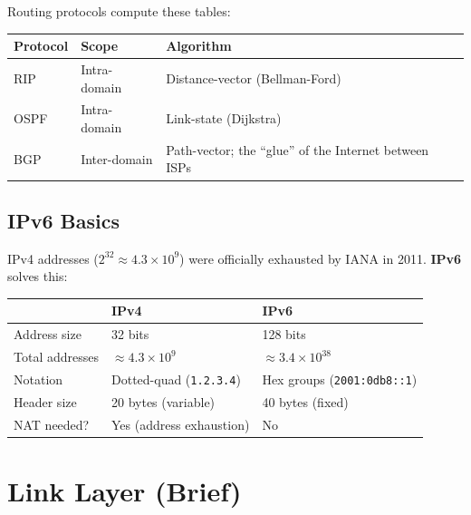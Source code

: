 \documentclass[oneside]{book}
\begin{document}
Routing protocols compute these tables:

\begin{center}
\begin{tabularx}{\linewidth}{llX}
\toprule
\textbf{Protocol} & \textbf{Scope} & \textbf{Algorithm} \\
\midrule
RIP  & Intra-domain & Distance-vector (Bellman-Ford) \\
OSPF & Intra-domain & Link-state (Dijkstra) \\
BGP  & Inter-domain  & Path-vector; the ``glue'' of the Internet between ISPs \\
\bottomrule
\end{tabularx}
\end{center}


\section{IPv6 Basics}

IPv4 addresses ($2^{32} \approx 4.3 \times 10^9$) were officially exhausted by
IANA in 2011.  \textbf{IPv6} solves this:

\begin{center}
\begin{tabularx}{\linewidth}{lll}
\toprule
 & \textbf{IPv4} & \textbf{IPv6} \\
\midrule
Address size & 32 bits & 128 bits \\
Total addresses & $\approx 4.3 \times 10^9$ & $\approx 3.4 \times 10^{38}$ \\
Notation & Dotted-quad (\texttt{1.2.3.4}) & Hex groups (\texttt{2001:0db8::1}) \\
Header size & 20 bytes (variable) & 40 bytes (fixed) \\
NAT needed? & Yes (address exhaustion) & No \\
\bottomrule
\end{tabularx}
\end{center}

\chapter{Link Layer (Brief)}
\end{document}
